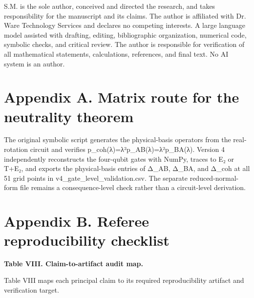 \documentclass[
]{article}
\begin{document}
S.M. is the sole author, conceived and directed the research, and takes
responsibility for the manuscript and its claims. The author is
affiliated with Dr. Ware Technology Services and declares no competing
interests. A large language model assisted with drafting, editing,
bibliographic organization, numerical code, symbolic checks, and
critical review. The author is responsible for verification of all
mathematical statements, calculations, references, and final text. No AI
system is an author.

\section{Appendix A. Matrix route for the neutrality
theorem}\label{appendix-a.-matrix-route-for-the-neutrality-theorem}

The original symbolic script generates the physical-basis operators from
the real-rotation circuit and verifies p\_coh(λ)=λ²p\_AB(λ)=λ²p\_BA(λ).
Version 4 independently reconstructs the four-qubit gates with NumPy,
traces to E₂ or T+E₂, and exports the physical-basis entries of Δ\_AB,
Δ\_BA, and Δ\_coh at all 51 grid points in
v4\_gate\_level\_validation.csv. The separate reduced-normal-form file
remains a consequence-level check rather than a circuit-level
derivation.

\section{Appendix B. Referee reproducibility
checklist}\label{appendix-b.-referee-reproducibility-checklist}

\textbf{Table VIII. Claim-to-artifact audit map.}

Table VIII maps each principal claim to its required reproducibility
artifact and verification target.
\end{document}
